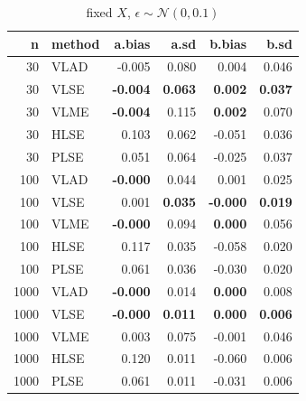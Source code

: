 \documentclass[twoside]{article}
\begin{document}
\begin{table}[ht]
\caption{fixed $X$, $\epsilon \sim \mathcal{N}(0,0.1)$}
\centering
\begin{tabular}{rlrrrr}
  \hline
  n & method & a.bias & a.sd & b.bias & b.sd \\ 
  \hline
  30 & VLAD & -0.005 & 0.080 & 0.004 & 0.046 \\ 
  30 & VLSE & \textbf{-0.004} & \textbf{0.063} & \textbf{0.002} & \textbf{0.037} \\ 
  30 & VLME & \textbf{-0.004} & 0.115 & \textbf{0.002} & 0.070 \\ 
  30 & HLSE & 0.103 & 0.062 & -0.051 & 0.036 \\ 
  30 & PLSE & 0.051 & 0.064 & -0.025 & 0.037 \\ 
  \hline
  100 & VLAD & \textbf{-0.000} & 0.044 & 0.001 & 0.025 \\ 
  100 & VLSE & 0.001 & \textbf{0.035} & \textbf{-0.000} & \textbf{0.019} \\ 
  100 & VLME & \textbf{-0.000} & 0.094 & \textbf{0.000} & 0.056 \\ 
  100 & HLSE & 0.117 & 0.035 & -0.058 & 0.020 \\ 
  100 & PLSE & 0.061 & 0.036 & -0.030 & 0.020 \\ 
   \hline
  1000 & VLAD & \textbf{-0.000} & 0.014 & \textbf{0.000} & 0.008 \\ 
  1000 & VLSE & \textbf{-0.000} & \textbf{0.011} & \textbf{0.000} & \textbf{0.006} \\ 
  1000 & VLME & 0.003 & 0.075 & -0.001 & 0.046 \\ 
  1000 & HLSE & 0.120 & 0.011 & -0.060 & 0.006 \\ 
  1000 & PLSE & 0.061 & 0.011 & -0.031 & 0.006 \\ 
   \hline
\end{tabular}
\end{table}
\end{document}
